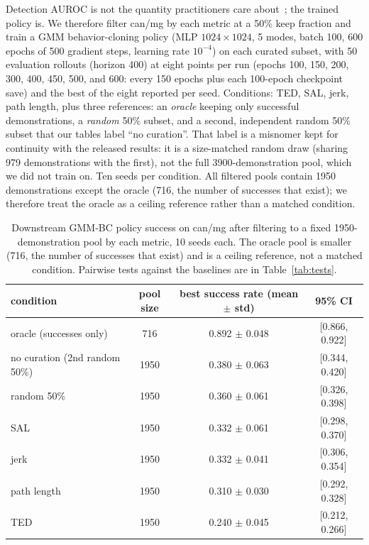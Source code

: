 \documentclass{article}
\begin{document}
Detection AUROC is not the quantity practitioners care
about~\citep{bedi-policy}; the trained policy is. We therefore filter can/mg
by each metric at a 50\% keep fraction and train a GMM behavior-cloning
policy (MLP $1024{\times}1024$, 5 modes, batch 100, 600 epochs of 500
gradient steps, learning rate $10^{-4}$) on each curated subset, with 50
evaluation rollouts (horizon 400) at eight points per run (epochs 100, 150,
200, 300, 400, 450, 500, and 600: every 150 epochs plus each 100-epoch
checkpoint save) and the best of the eight reported per seed. Conditions: TED, SAL, jerk, path length, plus three
references: an \emph{oracle} keeping only successful demonstrations, a
\emph{random} 50\% subset, and a second, independent random 50\% subset that
our tables label ``no curation''. That label is a misnomer kept for
continuity with the released results: it is a size-matched random draw
(sharing 979 demonstrations with the first), not the full
3900-demonstration pool, which we did not train on. Ten seeds
per condition. All filtered pools contain 1950 demonstrations except the
oracle (716, the number of successes that exist); we therefore treat the
oracle as a ceiling reference rather than a matched condition.

\begin{table}[t]
\centering
\small
\begin{tabular}{lccc}
\toprule
condition & pool size & best success rate (mean $\pm$ std) & 95\% CI \\
\midrule
oracle (successes only) & 716 & 0.892 $\pm$ 0.048 & [0.866, 0.922] \\
\midrule
no curation (2nd random 50\%) & 1950 & 0.380 $\pm$ 0.063 & [0.344, 0.420] \\
random 50\%             & 1950 & 0.360 $\pm$ 0.061 & [0.326, 0.398] \\
\midrule
SAL                     & 1950 & 0.332 $\pm$ 0.061 & [0.298, 0.370] \\
jerk                    & 1950 & 0.332 $\pm$ 0.041 & [0.306, 0.354] \\
path length             & 1950 & 0.310 $\pm$ 0.030 & [0.292, 0.328] \\
TED                     & 1950 & 0.240 $\pm$ 0.045 & [0.212, 0.266] \\
\bottomrule
\end{tabular}
\caption{Downstream GMM-BC policy success on can/mg after filtering to a
fixed 1950-demonstration pool by each metric, 10 seeds each. The oracle pool
is smaller (716, the number of successes that exist) and is a ceiling
reference, not a matched condition. Pairwise tests against the baselines are
in Table~\ref{tab:tests}.}
\label{tab:training}
\end{table}
\end{document}
